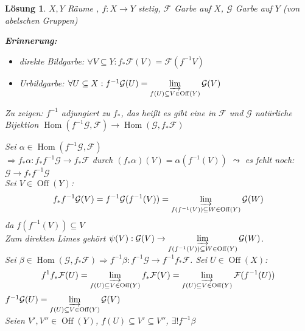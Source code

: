\documentclass[a4paper, 12pt, numbers=noendperiod, chapterprefix=true]{scrbook}
\theoremstyle{break}
\newtheorem{Loes}{L\"osung}
\theoremstyle{nonumberbreak}
\theoremstyle{nonumberplain}
\newcommand{\schraffiert}{\ensuremath{\nicefrac{\nicefrac{}{}}{\nicefrac{}{}}}}
\DeclareMathOperator{\Hom}{Hom}
\DeclareMathOperator{\Off}{Off}
\newcommand{\calF}{\mathcal{F}}
\newcommand{\calG}{\mathcal{G}}
\begin{document}
\begin{Loes}
$X, Y$ R\"aume , $f: X \to Y$ stetig, $\calF$ Garbe auf $X$, $\calG$ Garbe auf $Y$ (von abelschen Gruppen)

\textbf{Erinnerung:}\begin{itemize}
\item direkte Bildgarbe: $\forall  V \subseteq Y: f_{*}\calF(V) = \calF(f^{-1} V)$
\item Urbildgarbe: $\forall U\subseteq X: f^{-1} \calG(U) = \varinjlim\limits_{f(U) \subseteq V \in \Off(Y)} \calG(V)$
\end{itemize}
\emph{Zu zeigen:} $f^{-1}$ adjungiert zu $f_{*}$, das hei\ss t es gibt eine in $\calF$ und $\calG$ nat\"urliche Bijektion $\Hom(f^{-1}\calG, \calF) \to \Hom(\calG, f_*\calF)$

Sei $\alpha \in \Hom(f^{-1}\calG, \calF)$\\
$\Rightarrow f_*\alpha : f_*f^{-1}\calG \to f_*\calF$ durch $(f_*\alpha)(V) = \alpha (f^{-1}(V))$ $\leadsto$ es fehlt noch: $\calG \to f_{*}f^{-1}\calG$\\
Sei $V \in \Off(Y)$:
	\[ f_{*}f^{-1}\calG(V) = f^{-1}\calG(f^{-1}(V)) = \varinjlim\limits_{f(f^{-1}(V)) \subseteq W \in \Off(Y)} \calG(W)\]
da $f(f^{-1}(V)) \subseteq V$\\
Zum direkten Limes geh\"ort $\psi(V): \calG(V) \to \varinjlim\limits_{f(f^{-1}(V)) \subseteq W \in \Off(Y)} \calG(W)$.\\
Sei $\beta \in \Hom(\calG, f_*\calF) \Rightarrow f^{-1}\beta: f^{-1}\calG \to f^{-1} f_*\calF$. Sei $U\in \Off(X)$:
	\[f^{1}f_*\calF(U) = \varinjlim\limits_{f(U) \subseteq V \in \Off(Y)} f_*\calF(V) = \varinjlim\limits_{f(U) \subseteq V \in \Off(Y)}\calF(f^{-1}(U)) \]
$f^{-1}\calG(U) = \varinjlim\limits_{f(U) \subseteq V \in \Off(Y)} \calG(V)$\\
Seien $V', V'' \in \Off(Y)$, $f(U) \subseteq V' \subseteq V''$, $\exists! f^{-1}\beta$
\begin{center}
\end{center}
\end{Loes}
\end{document}
